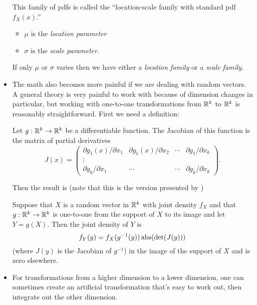 \begin{itemize}
  This family of pdfs is called the ``location-scale family with
  standard pdf $f_X(x)$.''
  \begin{itemize}
  \item $\mu$ is the \emph{location parameter}
  \item $\sigma$ is the \emph{scale parameter}.
  \end{itemize}
  If only $\mu$ or $\sigma$ varies then we have either a \emph{location
  family} or a \emph{scale family}.

\item The math also becomes more painful if we are dealing with random
  vectors.  A general theory is very painful to work with because of
  dimension changes in particular, but working with one-to-one
  transformations from $\mathbb{R}^k$ to $\mathbb{R}^k$ is reasonably straightforward.
  First we need a definition:
  
  \begin{defn}
    Let $g: \mathbb{R}^k \to \mathbb{R}^k$ be a differentiable function.  The Jacobian
    of this function is the matrix of partial derivatives
    \begin{equation*}
      J(x) =
      \begin{pmatrix} \partial g_1(x)/\partial x_1 & \partial g_1(x)/\partial x_2 & \cdots & \partial g_1/\partial x_k \\
      \vdots \\
      \partial g_k/\partial x_1 & \cdots & \cdots & \partial g_k/\partial x_k
      \end{pmatrix}.
    \end{equation*}
  \end{defn}
      
  Then the result is (note that this is the version presented by
  \citealp[B.7.7]{Gre12})
  \begin{thm}
    Suppose that $X$ is a random vector in $\mathbb{R}^k$ with joint density
    $f_X$ and that $g: \mathbb{R}^k \to \mathbb{R}^k$ is one-to-one from the support of
    $X$ to its image and let $Y = g(X)$.  Then the joint density of $Y$ is
    \begin{equation}
      f_Y(y) = f_X(g^{-1}(y)) \operatorname{abs}(\det( J(y) ))
    \end{equation}
    (where $J(y)$ is the Jacobian of $g^{-1}$) in the image of the support
    of $X$ and is zero elsewhere.
  \end{thm}

\item For transformations from a higher dimension to a lower
  dimension, one can sometimes create an artificial transformation
  that's easy to work out, then integrate out the other dimension.

\end{itemize}

